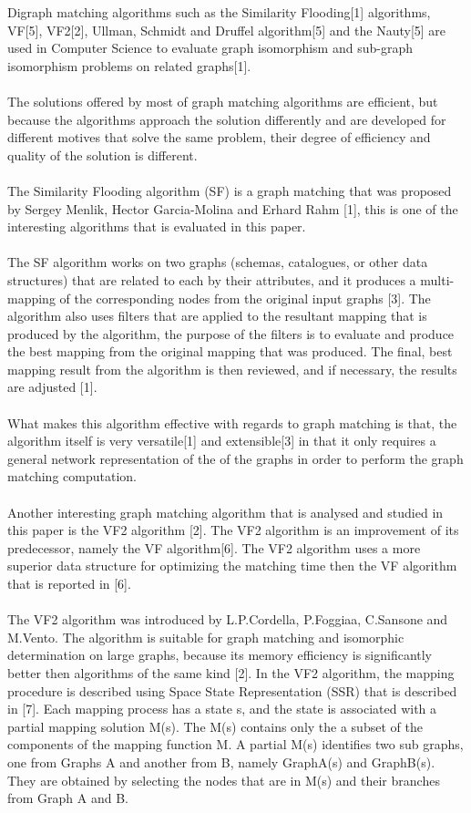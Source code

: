 \label{Literature Review}

Digraph matching algorithms such as the Similarity Flooding[1] algorithms, VF[5], VF2[2], Ullman, Schmidt and Druffel algorithm[5] and the Nauty[5] are used in Computer Science to evaluate graph isomorphism  and sub-graph isomorphism problems on related graphs[1].\\\\
The solutions offered by most of graph matching algorithms are efficient, but because the algorithms approach the solution differently and are developed for different motives that solve the same problem, their degree of efficiency and quality of the solution is different.\\\\
The Similarity Flooding algorithm (SF) is a graph matching that was proposed by Sergey Menlik, Hector Garcia-Molina and Erhard Rahm [1], this is one of the interesting algorithms that is evaluated in this paper.\\\\
The SF algorithm works on two graphs (schemas, catalogues, or other data structures) that are related to each by their attributes, and it produces a multi-mapping of the corresponding nodes from the original input graphs [3]. The algorithm also uses filters that are applied to the resultant mapping that is produced by the algorithm, the purpose of the filters is to evaluate and produce the best mapping from the original mapping that was produced. The final, best mapping result from the algorithm is then reviewed, and if necessary, the results are adjusted [1].\\\\
What makes this algorithm effective with regards to graph matching is that, the algorithm itself is very versatile[1] and extensible[3] in that it only requires a general network representation of the of the graphs in order to perform the graph matching computation.\\\\
Another interesting graph matching algorithm that is analysed and studied in this paper is the VF2 algorithm [2]. The VF2 algorithm is an improvement of its predecessor, namely the VF algorithm[6]. The VF2 algorithm uses a more superior data structure for optimizing the matching time then the VF algorithm that is reported in [6].\\\\
The VF2 algorithm was introduced by L.P.Cordella, P.Foggiaa, C.Sansone and M.Vento. The algorithm is suitable for graph matching and isomorphic determination on large graphs, because its memory efficiency is significantly better then algorithms of the same kind [2]. In the VF2 algorithm, the mapping procedure is described using Space State Representation (SSR) that is described in [7]. Each mapping process has a state s, and the state is associated with a partial mapping solution M(s). The M(s) contains only the a subset of the components of the mapping function M. A partial M(s) identifies two sub graphs, one from Graphs A and another from B, namely GraphA(s) and GraphB(s). They are obtained by selecting the nodes that are in M(s) and their branches from Graph A and B. \\\\
